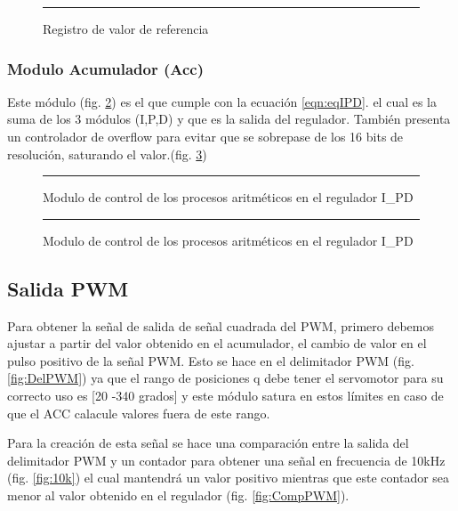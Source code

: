 \documentclass[12pt,a4paper]{article} %
\begin{document}
\begin{figure}[htbp]
  \centering
    \rule{35em}{0.3pt}
  \caption[rebot]{Registro de valor de referencia}
  \label{fig:P}
\end{figure}

\subsubsection{Modulo Acumulador (Acc)}

Este módulo (fig. \ref{fig:ACC}) es el que cumple con la ecuación \ref{eqn:eqIPD}. el cual es la suma de los 3 módulos (I,P,D) y que es la salida del regulador. También presenta un controlador de overflow para evitar que se sobrepase de los 16 bits de resolución, saturando el valor.(fig. \ref{fig:CTRLACC})

\begin{figure}[htbp]
  \centering
    \rule{35em}{0.3pt}
  \caption[ACC]{Modulo de control de los procesos aritméticos en el regulador I\_PD}
  \label{fig:ACC}
\end{figure}

\begin{figure}[htbp]
  \centering
    \rule{35em}{0.3pt}
  \caption[CTRLACC]{Modulo de control de los procesos aritméticos en el regulador I\_PD}
  \label{fig:CTRLACC}
\end{figure}




\subsection{Salida PWM}

Para obtener la señal de salida de señal cuadrada del PWM, primero debemos ajustar a partir del valor obtenido en el acumulador, el cambio de valor en el pulso positivo de la señal PWM. Esto se hace en el delimitador PWM (fig.\ref{fig:DelPWM}) ya que el rango de posiciones q debe tener el servomotor para su correcto uso es [20 -340 grados] y este módulo satura en estos límites en caso de que el ACC calacule valores fuera de este rango.

Para la creación de esta señal se hace una comparación entre la salida del delimitador PWM y un contador para obtener una señal en frecuencia de 10kHz (fig. \ref{fig:10k}) el cual mantendrá un valor positivo mientras que este contador sea menor al valor obtenido en el regulador (fig. \ref{fig:CompPWM}).
\end{document}
